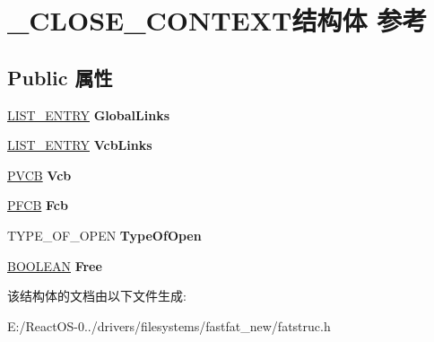 \hypertarget{struct___c_l_o_s_e___c_o_n_t_e_x_t}{}\section{\+\_\+\+C\+L\+O\+S\+E\+\_\+\+C\+O\+N\+T\+E\+X\+T结构体 参考}
\label{struct___c_l_o_s_e___c_o_n_t_e_x_t}
\subsection*{Public 属性}
\begin{DoxyCompactItemize}
\item 
\mbox{\label{struct___c_l_o_s_e___c_o_n_t_e_x_t_a4ebf9f7a7babf96ecb0180fed7602d8f}} 
\hyperlink{struct___l_i_s_t___e_n_t_r_y}{L\+I\+S\+T\+\_\+\+E\+N\+T\+RY} {\bfseries Global\+Links}
\item 
\mbox{\label{struct___c_l_o_s_e___c_o_n_t_e_x_t_ab45e00b06b7517d8ee919241bf1071fb}} 
\hyperlink{struct___l_i_s_t___e_n_t_r_y}{L\+I\+S\+T\+\_\+\+E\+N\+T\+RY} {\bfseries Vcb\+Links}
\item 
\mbox{\label{struct___c_l_o_s_e___c_o_n_t_e_x_t_a30192039f3dc7875facb0eaccdc38116}} 
\hyperlink{struct_d_e_v_i_c_e___e_x_t_e_n_s_i_o_n}{P\+V\+CB} {\bfseries Vcb}
\item 
\mbox{\label{struct___c_l_o_s_e___c_o_n_t_e_x_t_a4424686825d3fe7962fdcbba68755f1b}} 
\hyperlink{struct___f_c_b}{P\+F\+CB} {\bfseries Fcb}
\item 
\mbox{\label{struct___c_l_o_s_e___c_o_n_t_e_x_t_a653e5896cbebb9aafb0c6182b1ef555e}} 
T\+Y\+P\+E\+\_\+\+O\+F\+\_\+\+O\+P\+EN {\bfseries Type\+Of\+Open}
\item 
\mbox{\label{struct___c_l_o_s_e___c_o_n_t_e_x_t_ad7739002683a1bf32817dcd299f0bd88}} 
\hyperlink{_processor_bind_8h_a112e3146cb38b6ee95e64d85842e380a}{B\+O\+O\+L\+E\+AN} {\bfseries Free}
\end{DoxyCompactItemize}


该结构体的文档由以下文件生成\+:\begin{DoxyCompactItemize}
\item 
E\+:/\+React\+O\+S-\/0../drivers/filesystems/fastfat\+\_\+new/fatstruc.\+h\end{DoxyCompactItemize}
